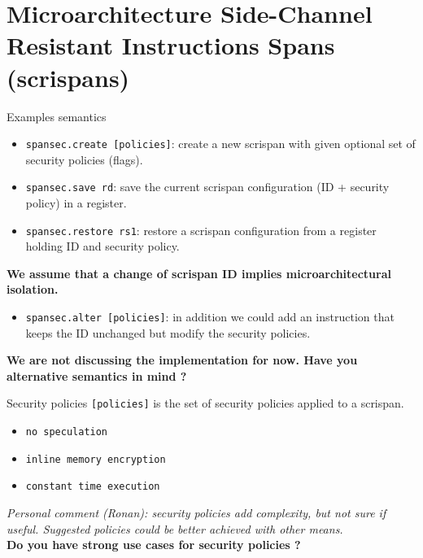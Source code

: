 \documentclass[11pt]{beamer}
\begin{document}
\section*{Microarchitecture Side-Channel Resistant Instructions Spans (scrispans)}
\frame{\sectionpage}

\begin{frame}{Examples semantics}
 
        \begin{itemize}
                \item \texttt{spansec.create [policies]}: create a new scrispan with given optional set of security policies (flags).
                \item \texttt{spansec.save rd}: save the current scrispan configuration (ID + security policy) in a register.
                \item \texttt{spansec.restore rs1}: restore a scrispan configuration from a register holding ID and security policy.
        \end{itemize}
                \textbf{We assume that a change of scrispan ID implies microarchitectural isolation.}
        \begin{itemize}
                \item \texttt{spansec.alter [policies]}: in addition we could add an instruction that keeps the ID unchanged but modify the security policies.
        \end{itemize}


        \textbf{We are not discussing the implementation for now. Have you alternative semantics in mind ?}
\end{frame}

\begin{frame}{Security policies}
        \texttt{[policies]} is the set of security policies applied to a scrispan.

        \begin{itemize}
                \item \texttt{no speculation}
                \item \texttt{inline memory encryption}
                \item \texttt{constant time execution}
        \end{itemize}

        \textit{Personal comment (Ronan): security policies add complexity, but not sure if useful. Suggested policies could be better achieved with other means.}\\
        \textbf{Do you have strong use cases for security policies ?}
\end{frame}
\end{document}
